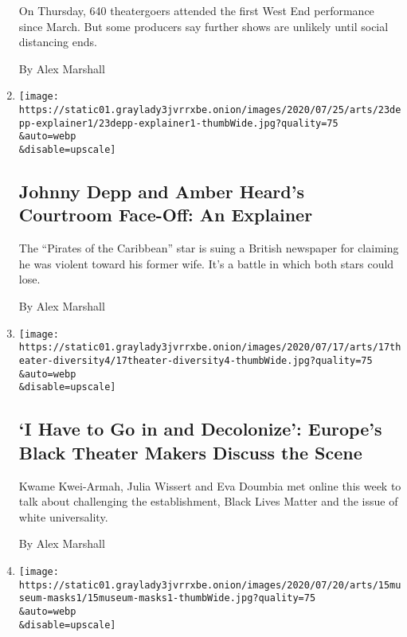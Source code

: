 \begin{enumerate}
  On Thursday, 640 theatergoers attended the first West End performance
  since March. But some producers say further shows are unlikely until
  social distancing ends.

  By Alex Marshall
\item
  \href{/2020/07/23/movies/johnny-depp-amber-heard-trial.html}{}

  \texttt{[image: https://static01.graylady3jvrrxbe.onion/images/2020/07/25/arts/23depp-explainer1/23depp-explainer1-thumbWide.jpg?quality=75\\\&auto=webp\\\&disable=upscale]}

  \hypertarget{johnny-depp-and-amber-heards-courtroom-face-off-an-explainer}{%
  \subsection{Johnny Depp and Amber Heard's Courtroom Face-Off: An
  Explainer}\label{johnny-depp-and-amber-heards-courtroom-face-off-an-explainer}}

  The ``Pirates of the Caribbean'' star is suing a British newspaper for
  claiming he was violent toward his former wife. It's a battle in which
  both stars could lose.

  By Alex Marshall
\item
  \href{/2020/07/20/theater/theater-diversity-europe.html}{}

  \texttt{[image: https://static01.graylady3jvrrxbe.onion/images/2020/07/17/arts/17theater-diversity4/17theater-diversity4-thumbWide.jpg?quality=75\\\&auto=webp\\\&disable=upscale]}

  \hypertarget{i-have-to-go-in-and-decolonize-europes-black-theater-makers-discuss-the-scene}{%
  \subsection{`I Have to Go in and Decolonize': Europe's Black Theater
  Makers Discuss the
  Scene}\label{i-have-to-go-in-and-decolonize-europes-black-theater-makers-discuss-the-scene}}

  Kwame Kwei-Armah, Julia Wissert and Eva Doumbia met online this week
  to talk about challenging the establishment, Black Lives Matter and
  the issue of white universality.

  By Alex Marshall
\item
  \href{/2020/07/16/arts/design/museums-masks.html}{}

  \texttt{[image: https://static01.graylady3jvrrxbe.onion/images/2020/07/20/arts/15museum-masks1/15museum-masks1-thumbWide.jpg?quality=75\\\&auto=webp\\\&disable=upscale]}


\end{enumerate}
